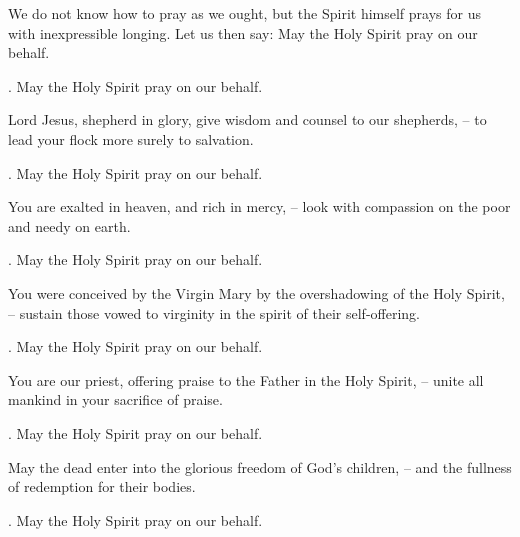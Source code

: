 \lettrine[loversize=0.15,lines=2]{W}{}e do not know how to pray as we ought, but the Spirit himself prays for us with inexpressible longing. Let us then say: May the Holy Spirit pray on our behalf.
\par \Rbar. May the Holy Spirit pray on our behalf.

Lord Jesus, shepherd in glory, give wisdom and counsel to our shepherds,
– to lead your flock more surely to salvation.
\par \Rbar. May the Holy Spirit pray on our behalf.

You are exalted in heaven, and rich in mercy,
– look with compassion on the poor and needy on earth.
\par \Rbar. May the Holy Spirit pray on our behalf.

You were conceived by the Virgin Mary by the overshadowing of the Holy Spirit,
– sustain those vowed to virginity in the spirit of their self-offering.
\par \Rbar. May the Holy Spirit pray on our behalf.

You are our priest, offering praise to the Father in the Holy Spirit,
– unite all mankind in your sacrifice of praise.
\par \Rbar. May the Holy Spirit pray on our behalf.

May the dead enter into the glorious freedom of God’s children,
– and the fullness of redemption for their bodies.
\par \Rbar. May the Holy Spirit pray on our behalf.